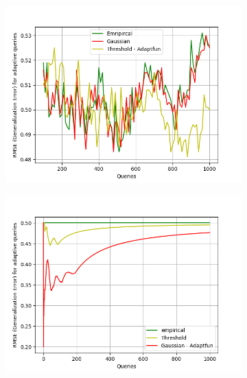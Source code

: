 {\small
\begin{figure}
\centering
\begin{subfigure}{.32\textwidth}
\begin{centering}
\includegraphics[width=1.0\textwidth]{c_adaptivity.png}
\caption{}
\end{centering}
\end{subfigure}
\begin{subfigure}{.32\textwidth}
\begin{centering}
\includegraphics[width=1.0\textwidth]{n_adaptivity.png}
\caption{}
\end{centering}
\end{subfigure}
\quad
\begin{subfigure}{.3\textwidth}

\end{subfigure}
\end{figure}}
